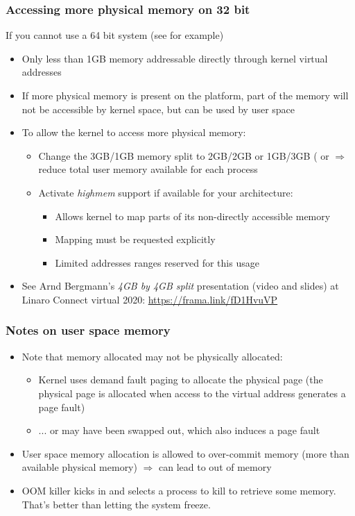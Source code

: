 \begin{frame}
  \frametitle{Accessing more physical memory on 32 bit}
  If you cannot use a 64 bit system (see  for example)
  \begin{itemize}
  \item Only less than 1GB memory addressable directly through kernel virtual addresses
  \item If more physical memory is present on the platform, part of
        the memory will not be accessible by kernel space, but can be used
         by user space
  \item To allow the kernel to access more physical memory:
    \begin{itemize}
    \item Change the 3GB/1GB memory split to 2GB/2GB or 1GB/3GB
          ( or 
          $\Rightarrow$ reduce total user memory available for each process
    \item Activate \emph{highmem} support if available for your
          architecture:
      \begin{itemize}
      \item Allows kernel to map parts of its non-directly accessible
            memory
      \item Mapping must be requested explicitly
      \item Limited addresses ranges reserved for this usage
      \end{itemize}
    \end{itemize}
  \item See Arnd Bergmann's {\em 4GB by 4GB split} presentation (video
        and slides) at Linaro Connect virtual 2020: \url{https://frama.link/fD1HvuVP}
  \end{itemize}
\end{frame}

\begin{frame}
  \frametitle{Notes on user space memory}
  \begin{itemize}
  \item Note that memory allocated may not be physically allocated:
    \begin{itemize}
    \item Kernel uses demand fault paging to allocate the physical
      page (the physical page is allocated when access to the virtual
      address generates a page fault)
    \item ... or may have been swapped out, which also induces a page
      fault
    \end{itemize}
  \item User space memory allocation is allowed to over-commit memory
    (more than available physical memory) $\Rightarrow$ can lead to
    out of memory
  \item OOM killer kicks in and selects a process to kill to retrieve
    some memory. That's better than letting the system freeze.
  \end{itemize}
\end{frame}

